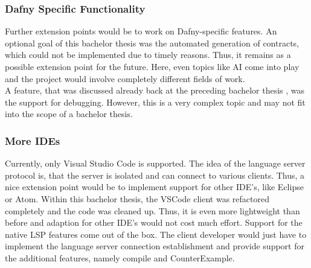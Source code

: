 \subsubsection{Dafny Specific Functionality}
Further extension points would be to work on Dafny-specific features.
An optional goal of this bachelor thesis was the automated generation of contracts, which could not be implemented due to timely reasons.
Thus, it remains as a possible extension point for the future.
Here, even topics like AI come into play and the project would involve completely different fields of work.\\

A feature, that was discussed already back at the preceding bachelor thesis \cite{ba}, was the support for debugging.
However, this is a very complex topic and may not fit into the scope of a bachelor thesis.

\subsubsection{More IDEs}
Currently, only Visual Studio Code is supported.
The idea of the language server protocol is, that the server is isolated and can connect to various clients.
Thus, a nice extension point would be to implement support for other IDE's, like Eclipse or Atom.
Within this bachelor thesis, the VSCode client was refactored completely and the code was cleaned up.
Thus, it is even more lightweight than before and adaption for other IDE's would not cost much effort.
Support for the native LSP features come out of the box.
The client developer would just have to implement the language server connection establishment and provide support for the additional features, namely compile and CounterExample.

